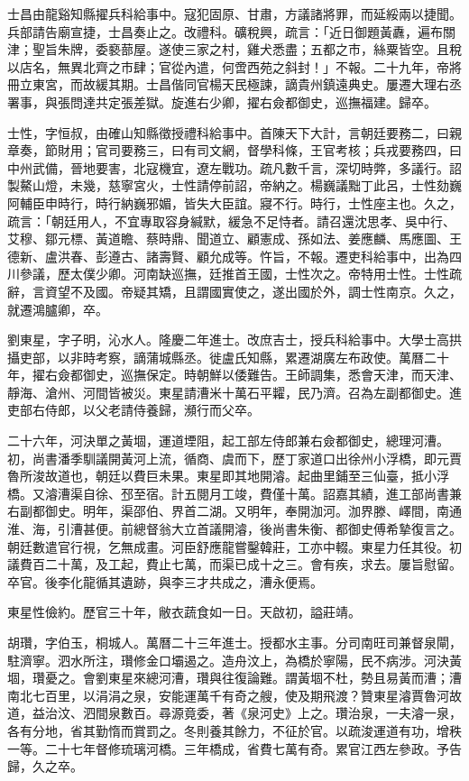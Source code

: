 \begin{pinyinscope}
{{士昌由龍谿知縣擢兵科給事中。寇犯固原、甘肅，方議諸將罪，而延綏兩以捷聞。兵部請告廟宣捷，士昌奏止之。改禮科。礦稅興，疏言：「近日御題黃纛，遍布關津；聖旨朱牌，委褻蔀屋。遂使三家之村，雞犬悉盡；五都之市，絲粟皆空。且稅以店名，無異北齊之市肆；官從內遣，何啻西苑之斜封！」不報。二十九年，帝將冊立東宮，而故緩其期。士昌偕同官楊天民極諫，謫貴州鎮遠典史。屢遷大理右丞署事，與張問達共定張差獄。旋進右少卿，擢右僉都御史，巡撫福建。歸卒。

士性，字恒叔，由確山知縣徵授禮科給事中。首陳天下大計，言朝廷要務二，曰親章奏，節財用；官司要務三，曰有司文網，督學科條，王官考核；兵戎要務四，曰中州武備，晉地要害，北寇機宜，遼左戰功。疏凡數千言，深切時弊，多議行。詔製鰲山燈，未幾，慈寧宮火，士性請停前詔，帝納之。楊巍議黜丁此呂，士性劾巍阿輔臣申時行，時行納巍邪媚，皆失大臣誼。寢不行。時行，士性座主也。久之，疏言：「朝廷用人，不宜專取容身緘默，緩急不足恃者。請召還沈思孝、吳中行、艾穆、鄒元標、黃道瞻、蔡時鼎、聞道立、顧憲成、孫如法、姜應麟、馬應圖、王德新、盧洪春、彭遵古、諸壽賢、顧允成等。忤旨，不報。遷吏科給事中，出為四川參議，歷太僕少卿。河南缺巡撫，廷推首王國，士性次之。帝特用士性。士性疏辭，言資望不及國。帝疑其矯，且謂國實使之，遂出國於外，調士性南京。久之，就遷鴻臚卿，卒。

劉東星，字子明，沁水人。隆慶二年進士。改庶吉士，授兵科給事中。大學士高拱攝吏部，以非時考察，謫蒲城縣丞。徙盧氏知縣，累遷湖廣左布政使。萬曆二十年，擢右僉都御史，巡撫保定。時朝鮮以倭難告。王師調集，悉會天津，而天津、靜海、滄州、河間皆被災。東星請漕米十萬石平糶，民乃濟。召為左副都御史。進吏部右侍郎，以父老請侍養歸，瀕行而父卒。

二十六年，河決單之黃堌，運道堙阻，起工部左侍郎兼右僉都御史，總理河漕。初，尚書潘季馴議開黃河上流，循商、虞而下，歷丁家道口出徐州小浮橋，即元賈魯所浚故道也，朝廷以費巨未果。東星即其地開濬。起曲里鋪至三仙臺，抵小浮橋。又濬漕渠自徐、邳至宿。計五閱月工竣，費僅十萬。詔嘉其績，進工部尚書兼右副都御史。明年，渠邵伯、界首二湖。又明年，奉開泇河。泇界滕、嶧間，南通淮、海，引漕甚便。前總督翁大立首議開濬，後尚書朱衡、都御史傅希摯復言之。朝廷數遣官行視，乞無成畫。河臣舒應龍嘗鑿韓莊，工亦中輟。東星力任其役。初議費百二十萬，及工起，費止七萬，而渠已成十之三。會有疾，求去。屢旨慰留。卒官。後李化龍循其遺跡，與李三才共成之，漕永便焉。

東星性儉約。歷官三十年，敝衣蔬食如一日。天啟初，謚莊靖。

胡瓚，字伯玉，桐城人。萬曆二十三年進士。授都水主事。分司南旺司兼督泉閘，駐濟寧。泗水所注，瓚修金口壩遏之。造舟汶上，為橋於寧陽，民不病涉。河決黃堌，瓚憂之。會劉東星來總河漕，瓚與往復論難。謂黃堌不杜，勢且易黃而漕；漕南北七百里，以涓涓之泉，安能運萬千有奇之艘，使及期飛渡？贊東星濬賈魯河故道，益治汶、泗間泉數百。尋源竟委，著《泉河史》上之。瓚治泉，一夫濬一泉，各有分地，省其勤惰而賞罰之。冬則養其餘力，不征於官。以疏浚運道有功，增秩一等。二十七年督修琉璃河橋。三年橋成，省費七萬有奇。累官江西左參政。予告歸，久之卒。

}}
\end{pinyinscope}

